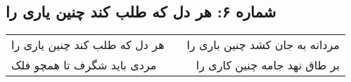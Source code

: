 \begin{center}
\section*{شماره ۶: هر دل که طلب کند چنین یاری را}
\label{sec:006}
\begin{longtable}{l p{0.5cm} r}
هر دل که طلب کند چنین یاری را
&&
مردانه به جان کشد چنین باری را
\\
مردی باید شگرف تا همچو فلک
&&
بر طاق نهد جامه چنین کاری را
\\
\end{longtable}
\end{center}
